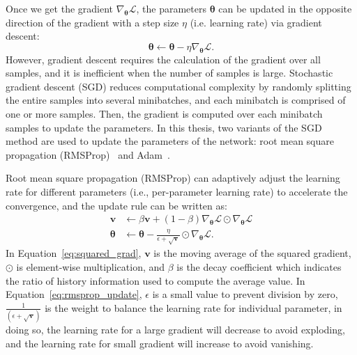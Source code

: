 Once we get the gradient $\nabla_{\bm{\theta}}\mathcal{L}$, the parameters $\bm{\theta}$ can be updated in the opposite direction of the gradient with a step size $\eta$ (i.e. learning rate) via gradient descent:
\begin{equation}
    \bm{\theta} \leftarrow \bm{\theta} - \eta\nabla_{\bm{\theta}}\mathcal{L}.
\end{equation}
However, gradient descent requires the calculation of the gradient over all samples, and it is inefficient when the number of samples is large. Stochastic gradient descent (SGD) reduces computational complexity by randomly splitting the entire samples into several minibatches, and each minibatch is comprised of one or more samples. Then, the gradient is computed over each minibatch samples to update the parameters. 
In this thesis, two variants of the SGD method are used to update the parameters of the network: root mean square propagation (RMSProp)~\cite{tieleman2012lecture} and Adam~\cite{kingma2014adam}.

Root mean square propagation (RMSProp) can adaptively adjust the learning rate for different parameters (i.e., per-parameter learning rate) to accelerate the convergence, and the update rule can be written as:
\begin{align}
    \mathbf{v} &\leftarrow \beta \mathbf{v} + (1 - \beta)\nabla_{\bm{\theta}}\mathcal{L}\odot\nabla_{\bm{\theta}}\mathcal{L} \label{eq:squared_grad}\\
     \bm{\theta} &\leftarrow \bm{\theta} - \frac{\eta}{\epsilon+\sqrt{\mathbf{v}}}\odot\nabla_{\bm{\theta}}\mathcal{L} \label{eq:rmsprop_update}.
\end{align}
In Equation~\eqref{eq:squared_grad}, $\mathbf{v}$ is the moving average of the squared gradient, $\odot$ is element-wise multiplication, and $\beta$ is the decay coefficient which indicates the ratio of history information used to compute the average value. In Equation~\eqref{eq:rmsprop_update}, $\epsilon$ is a small value to prevent division by zero, $\frac{1}{(\epsilon + \sqrt{\mathbf{v}})}$ is the weight to balance the learning rate for individual parameter, in doing so, the learning rate for a large gradient will decrease to avoid exploding, and the learning rate for small gradient will increase to avoid vanishing.

